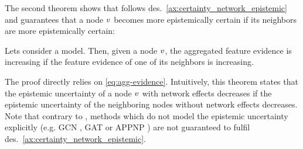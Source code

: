 The second theorem shows that \GPNacro{} follows des.~\ref{ax:certainty_network_epistemic} and guarantees that a node $v$ becomes more epistemically certain if its neighbors are more epistemically certain:
\begin{theorem}
\label{thm:axiom-network-epistemic}
Lets consider a \GPNacro{} model. Then, given a node $v$, the aggregated feature evidence  is increasing if the feature evidence  of one of its neighbors \smash{$\nodeu \in \neighbors(\nodev)$} is increasing.
\end{theorem}
The proof directly relies on \cref{eq:agg-evidence}. Intuitively, this theorem states that the epistemic uncertainty  of a node $v$ with network effects decreases if the epistemic uncertainty of the neighboring nodes without network effects decreases. Note that contrary to \GPNacro{}, methods which do not model the epistemic uncertainty explicitly (e.g. GCN \cite{Kipf2016}, GAT \citep{Velickovic2017} or APPNP \citep{Klicpera2018}) are not guaranteed to fulfil des.~\ref{ax:certainty_network_epistemic}. 

